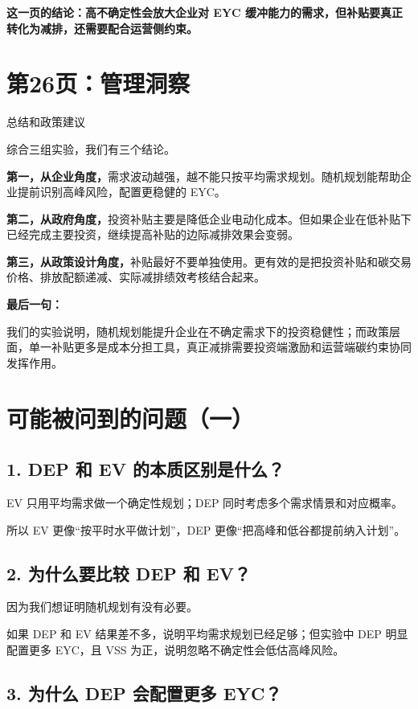\documentclass[UTF8,zihao=false,12pt]{ctexart}
\newcommand{\slide}[2]{%
  \section*{#1}
  {\color{muted}#2}\par
  \vspace{0.4em}
}
\begin{document}
\textbf{这一页的结论：高不确定性会放大企业对 EYC 缓冲能力的需求，但补贴要真正转化为减排，还需要配合运营侧约束。}

\newpage

\slide{第26页：管理洞察}{总结和政策建议}

综合三组实验，我们有三个结论。

\textbf{第一，从企业角度，}需求波动越强，越不能只按平均需求规划。随机规划能帮助企业提前识别高峰风险，配置更稳健的 EYC。

\textbf{第二，从政府角度，}投资补贴主要是降低企业电动化成本。但如果企业在低补贴下已经完成主要投资，继续提高补贴的边际减排效果会变弱。

\textbf{第三，从政策设计角度，}补贴最好不要单独使用。更有效的是把投资补贴和碳交易价格、排放配额递减、实际减排绩效考核结合起来。

\vspace{0.4em}
\textbf{最后一句：}

我们的实验说明，随机规划能提升企业在不确定需求下的投资稳健性；而政策层面，单一补贴更多是成本分担工具，真正减排需要投资端激励和运营端碳约束协同发挥作用。

\newpage

\section*{可能被问到的问题（一）}
\subsection*{1. DEP 和 EV 的本质区别是什么？}

EV 只用平均需求做一个确定性规划；DEP 同时考虑多个需求情景和对应概率。

所以 EV 更像“按平时水平做计划”，DEP 更像“把高峰和低谷都提前纳入计划”。

\subsection*{2. 为什么要比较 DEP 和 EV？}

因为我们想证明随机规划有没有必要。

如果 DEP 和 EV 结果差不多，说明平均需求规划已经足够；但实验中 DEP 明显配置更多 EYC，且 VSS 为正，说明忽略不确定性会低估高峰风险。

\subsection*{3. 为什么 DEP 会配置更多 EYC？}
\end{document}
